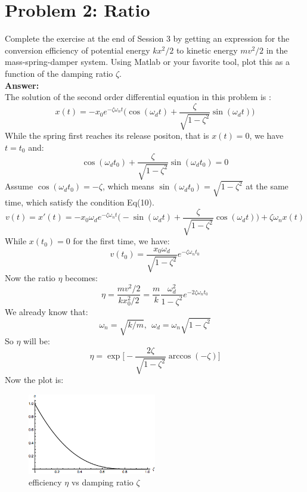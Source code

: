 \documentclass[a4paper]{article}
\begin{document}
\section{Problem 2: Ratio}
Complete the exercise at the end of Session 3 by getting an expression for the conversion efficiency of potential energy $kx^2/2$ to kinetic energy $mv^2/2$ in the mass-spring-damper system.
Using Matlab or your favorite tool, plot this as a function of the damping ratio $\zeta$.\\
{\bf Answer: }\\
The solution of the second order differential equation in this problem is :
\begin{equation}
	x(t) = -x_0e^{-\zeta\omega_n t}\Big(\cos(\omega_dt)+\frac{\zeta}{\sqrt{1-\zeta^2}}\sin(\omega_d t)\Big)
\end{equation}
While the spring first reaches its release positon, that is $x(t) = 0$, we have $t = t_0$ and: 
\begin{equation}
	\cos (\omega_d t_0) + \frac{\zeta}{\sqrt{1-\zeta^2}}\sin (\omega_d t_0) = 0
\end{equation}
Assume $\cos(\omega_dt_0) = -\zeta$, which means $\sin(\omega_dt_0) = \sqrt{1-\zeta^2}$ at the same time, which satisfy the condition Eq(10).\\
\begin{equation} 
	v(t) = x'(t) =-x_0\omega_d e^{-\zeta\omega_n t}\Big(-\sin(\omega_dt)+\frac{\zeta}{\sqrt{1-\zeta^2}}\cos(\omega_d t)\Big)+\zeta\omega_n x(t)
\end{equation}
While $x(t_0) = 0$ for the first time, we have:
\begin{equation}
 	v(t_0) = \frac{x_0\omega_d}{\sqrt{1-\zeta^2}}e^{-\zeta\omega_n t_0}
 \end{equation}
Now the ratio $\eta$ becomes:
\begin{equation}
  	\eta = \frac{ mv^2/2}{kx_0^2/2} = \frac{m}{k}\frac{\omega_d^2}{1-\zeta^2}e^{-2\zeta\omega_n t_0}
\end{equation} 
We already know that:
$$
\omega_n = \sqrt{k/m},\ \ \omega_d = \omega_n\sqrt{1-\zeta^2}
$$
So $\eta$ will be: 
\begin{equation}
	\eta = \exp \big[-\frac{2\zeta}{\sqrt{1-\zeta^2}}\arccos(-\zeta)\big]
\end{equation}
Now the plot is:
\begin{figure}[hbtp]
\centering
\includegraphics[width=0.5\textwidth]{pic/eta_zeta.png}
\caption{efficiency $\eta$ vs damping ratio $\zeta$} 
\label{eta_zeta}
\end{figure}
\end{document}
